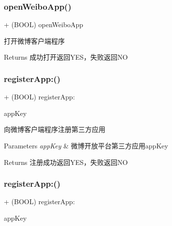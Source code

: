 \subsubsection{\texorpdfstring{open\+Weibo\+App()}{openWeiboApp()}\hspace{0.1cm}{\footnotesize\ttfamily [3/3]}}
{\footnotesize\ttfamily + (B\+O\+OL) open\+Weibo\+App \begin{DoxyParamCaption}{ }\end{DoxyParamCaption}}

打开微博客户端程序 \begin{DoxyReturn}{Returns}
成功打开返回\+Y\+E\+S，失败返回\+NO 
\end{DoxyReturn}
\mbox{\label{interface_weibo_s_d_k_ae11cd35ddd3b8ab9f0dea249e830aa72}} 
\subsubsection{\texorpdfstring{register\+App\+:()}{registerApp:()}\hspace{0.1cm}{\footnotesize\ttfamily [1/3]}}
{\footnotesize\ttfamily + (B\+O\+OL) register\+App\+: \begin{DoxyParamCaption}\item[{(N\+S\+String $\ast$)}]{app\+Key }\end{DoxyParamCaption}}

向微博客户端程序注册第三方应用 
\begin{DoxyParams}{Parameters}
{\em app\+Key} & 微博开放平台第三方应用app\+Key \\
\hline
\end{DoxyParams}
\begin{DoxyReturn}{Returns}
注册成功返回\+Y\+E\+S，失败返回\+NO 
\end{DoxyReturn}
\mbox{\label{interface_weibo_s_d_k_ae11cd35ddd3b8ab9f0dea249e830aa72}} 
\subsubsection{\texorpdfstring{register\+App\+:()}{registerApp:()}\hspace{0.1cm}{\footnotesize\ttfamily [2/3]}}
{\footnotesize\ttfamily + (B\+O\+OL) register\+App\+: \begin{DoxyParamCaption}\item[{(N\+S\+String $\ast$)}]{app\+Key }\end{DoxyParamCaption}}

